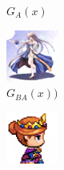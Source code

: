 \documentclass{beamer}
\begin{document}
\begin{frame}
\begin{figure}[htb]
\begin{subfigure}[b]{0.23\linewidth}
        \caption{$G_A(x)$}
      \end{subfigure}
      \begin{subfigure}[b]{0.23\linewidth}
        \includegraphics[width=\linewidth]{exp3_epoch194_rec_A.png}
        \caption{$G_{BA}(x))$}
      \end{subfigure}
      \begin{subfigure}[b]{0.23\linewidth}
        \includegraphics[width=\linewidth]{exp3_epoch194_idt_A.png}

\end{subfigure}
\end{figure}
\end{frame}
\end{document}
